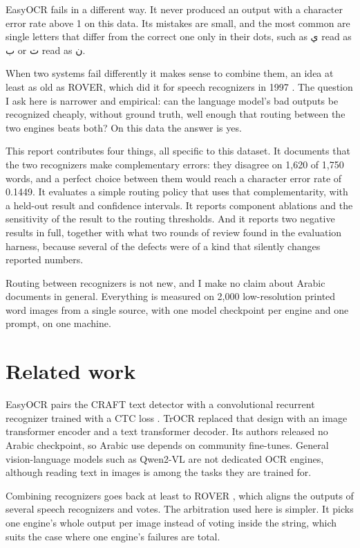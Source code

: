 \documentclass[11pt,a4paper]{article}
\newcommand{\ar}[1]{{\beginR\arabicfont #1\endR}}
\begin{document}
EasyOCR fails in a different way. It never produced an output with a character
error rate above 1 on this data. Its mistakes are small, and the most common
are single letters that differ from the correct one only in their dots, such
as \ar{ي} read as \ar{ب} or \ar{ت} read as \ar{ن}.

When two systems fail differently it makes sense to combine them, an idea at
least as old as ROVER, which did it for speech recognizers in 1997
\cite{rover}. The question I ask here is narrower and empirical: can the
language model's bad outputs be recognized cheaply, without ground truth, well
enough that routing between the two engines beats both? On this data the
answer is yes.

This report contributes four things, all specific to this dataset. It
documents that the two recognizers make complementary errors: they disagree
on 1,620 of 1,750 words, and a perfect choice between them would reach a
character error rate of 0.1449. It evaluates a simple routing policy that
uses that complementarity, with a held-out result and confidence intervals.
It reports component ablations and the sensitivity of the result to the
routing thresholds. And it reports two negative results in full, together
with what two rounds of review found in the evaluation harness, because
several of the defects were of a kind that silently changes reported
numbers.

Routing between recognizers is not new, and I make no claim about Arabic
documents in general. Everything is measured on 2,000 low-resolution printed
word images from a single source, with one model checkpoint per engine and one
prompt, on one machine.

\section{Related work}

EasyOCR pairs the CRAFT text detector \cite{craft} with a convolutional
recurrent recognizer trained with a CTC loss \cite{crnn}. TrOCR \cite{trocr}
replaced that design with an image transformer encoder and a text transformer
decoder. Its authors released no Arabic checkpoint, so Arabic use depends on
community fine-tunes. General vision-language models such as Qwen2-VL
\cite{qwen2vl} are not dedicated OCR engines, although reading text in images
is among the tasks they are trained for.

Combining recognizers goes back at least to ROVER \cite{rover}, which aligns the
outputs of several speech recognizers and votes. The arbitration used here is
simpler. It picks one engine's whole output per image instead of voting inside
the string, which suits the case where one engine's failures are total.
\end{document}
